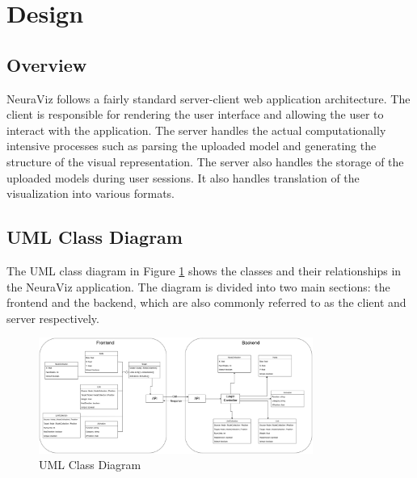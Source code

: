 \section{Design}
\label{sec:Design}

\subsection{Overview} 
NeuraViz follows a fairly standard server-client web application architecture. The client is responsible for rendering the user interface and allowing the user to interact with the application. The server handles the actual computationally intensive processes such as parsing the uploaded model and generating the structure of the visual representation. The server also handles the storage of the uploaded models during user sessions. It also handles translation of the visualization into various formats.

\subsection{UML Class Diagram}
The UML class diagram in Figure \ref{fig:uml_class_diagram} shows the classes and their relationships in the NeuraViz application. The diagram is divided into two main sections: the frontend and the backend, which are also commonly referred to as the client and server respectively. 

\begin{figure}[h]
    \centering
    \includegraphics[width=0.8\textwidth]{../docs/diagrams/class_diagram.png}
    \caption{UML Class Diagram}
    \label{fig:uml_class_diagram}
\end{figure}

